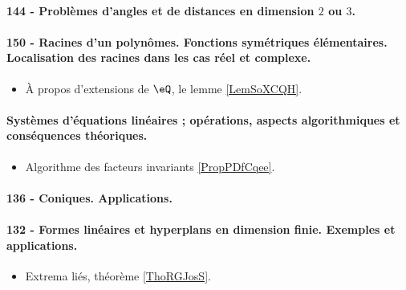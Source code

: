 \paragraph{144 - Problèmes d’angles et de distances en dimension $2$ ou $3$.}
\paragraph{150 - Racines d’un polynômes. Fonctions symétriques élémentaires. Localisation des racines dans les cas réel et complexe.}
\begin{itemize}
    \item À propos d'extensions de \( \eQ\), le lemme \ref{LemSoXCQH}.
\end{itemize}
\paragraph{Systèmes d'équations linéaires ; opérations, aspects algorithmiques et conséquences théoriques.}
\begin{itemize}
    \item Algorithme des facteurs invariants \ref{PropPDfCqee}.
\end{itemize}
\paragraph{136 - Coniques. Applications.}
\paragraph{132 - Formes linéaires et hyperplans en dimension finie. Exemples et applications.}
\begin{itemize}
    \item Extrema liés, théorème \ref{ThoRGJosS}.
\end{itemize}
